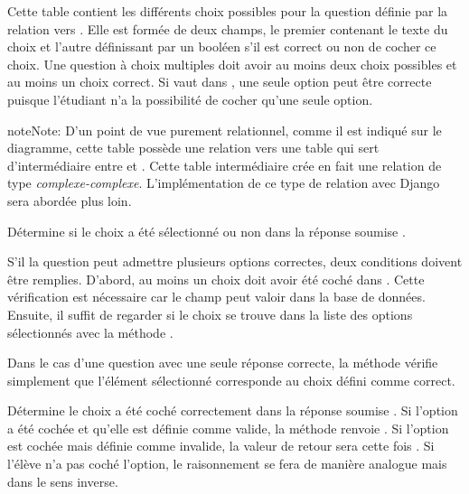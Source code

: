 \documentclass[a4paper,11pt,openany,oneside]{sphinxmanual}
\begin{document}
\begin{fulllineitems}
\label{database:quiz.models.QcmChoice}
Cette table contient les différents choix possibles pour la question définie
par la relation vers . Elle est formée de deux champs, le premier contenant
le texte du choix et l'autre définissant par un booléen s'il est correct ou
non de cocher ce choix. Une question à choix multiples doit avoir au moins
deux choix possibles et au moins un choix correct. Si  vaut
 dans , une seule option peut être correcte puisque l'étudiant
n'a la possibilité de cocher qu'une seule option.

\begin{notice}{note}{Note:}
D'un point de vue purement relationnel, comme il est indiqué sur
le diagramme, cette table possède une relation vers une table qui sert
d'intermédiaire entre  et . Cette table intermédiaire
crée en fait une relation de type \emph{complexe-complexe}. L'implémentation de ce
type de relation avec Django sera abordée plus loin.
\end{notice}

\begin{fulllineitems}
\label{database:quiz.models.QcmChoice.checked}
Détermine si le choix a été sélectionné ou non dans la réponse soumise
.

S'il la question peut admettre plusieurs options correctes, deux conditions doivent
être remplies. D'abord, au moins un choix doit avoir été coché dans .
Cette vérification est nécessaire car le champ  peut
valoir  dans la base de données. Ensuite, il suffit de regarder
si le choix se trouve dans la liste des options sélectionnés avec la méthode
.

Dans le cas d'une question avec une seule réponse correcte, la méthode
vérifie simplement que l'élément sélectionné corresponde au choix défini comme
correct.

\end{fulllineitems}


\begin{fulllineitems}
\label{database:quiz.models.QcmChoice.correct_submit}
Détermine le choix  a été coché correctement dans la réponse
soumise . Si l'option a été cochée et qu'elle est définie
comme valide, la méthode renvoie . Si l'option est cochée mais
définie comme invalide, la valeur de retour sera cette fois .
Si l'élève n'a pas coché l'option, le raisonnement se fera de manière analogue
mais dans le sens inverse.


\end{fulllineitems}
\end{fulllineitems}
\end{document}
